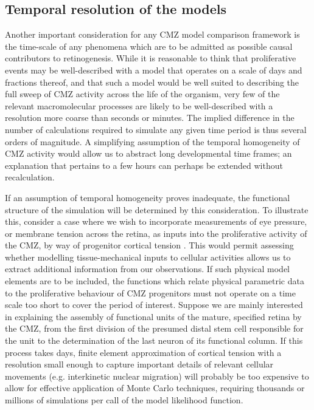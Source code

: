 \documentclass{ut-thesis}
\begin{document}
\begin{NoHyper}
\FloatBarrier

\subsection{Temporal resolution of the models}
Another important consideration for any CMZ model comparison framework is the time-scale of any phenomena which are to be admitted as possible causal contributors to retinogenesis. While it is reasonable to think that proliferative events may be well-described with a model that operates on a scale of days and fractions thereof, and that such a model would be well suited to describing the full sweep of CMZ activity across the life of the organism, very few of the relevant macromolecular processes are likely to be well-described with a resolution more coarse than seconds or minutes. The implied difference in the number of calculations required to simulate any given time period is thus several orders of magnitude. A simplifying assumption of the temporal homogeneity of CMZ activity would allow us to abstract long developmental time frames; an explanation that pertains to a few hours can perhaps be extended without recalculation. 

If an assumption of temporal homogeneity proves inadequate, the functional structure of the simulation will be determined by this consideration. To illustrate this, consider a case where we wish to incorporate measurements of eye pressure, or membrane tension across the retina, as inputs into the proliferative activity of the CMZ, by way of progenitor cortical tension \cite{Winklbauer2015}. This would permit assessing whether modelling tissue-mechanical inputs to cellular activities allows us to extract additional information from our observations. If such physical model elements are to be included, the functions which relate physical parametric data to the proliferative behaviour of CMZ progenitors must not operate on a time scale too short to cover the period of interest. Suppose we are mainly interested in explaining the assembly of functional units of the mature, specified retina by the CMZ, from the first division of the presumed distal stem cell responsible for the unit to the determination of the last neuron of its functional column. If this process takes days, finite element approximation of cortical tension with a resolution small enough to capture important details of relevant cellular movements (e.g. interkinetic nuclear migration) will probably be too expensive to allow for effective application of Monte Carlo techniques, requiring thousands or millions of simulations per call of the model likelihood function.


\end{NoHyper}
\end{document}
